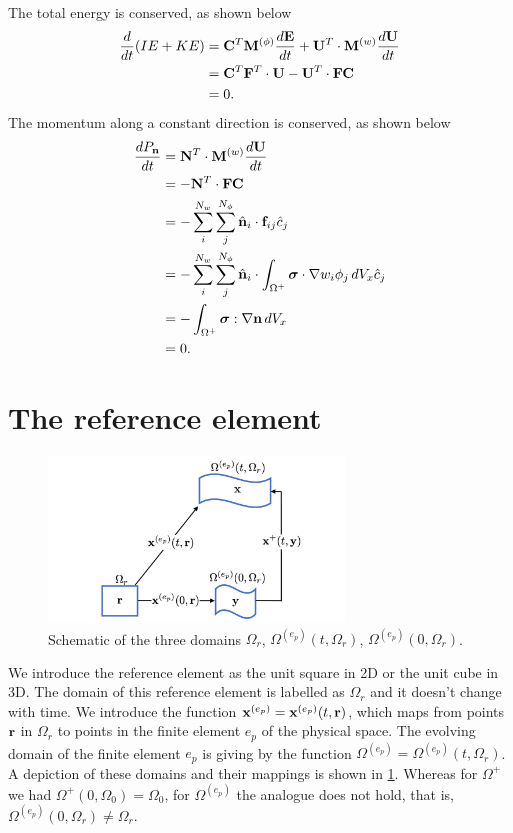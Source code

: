 \documentclass[11pt]{report}
\begin{document}
The total energy is conserved, as shown below
\begin{align}
    \frac{d}{dt} (IE + KE) &= \mathbf{C}^T \mathbf{M}^{(\phi)} \frac{d\mathbf{E}}{dt} + \mathbf{U}^T \cdot \mathbf{M}^{(w)} \frac{d\mathbf{U}}{dt} \nonumber \\
    &= \mathbf{C}^T \mathbf{F}^T \cdot \mathbf{U} - \mathbf{U}^T \cdot \mathbf{F} \mathbf{C} \nonumber \\
    &= 0.
\end{align}
The momentum along a constant direction is conserved, as shown below
\begin{align}
    \frac{d P_{\mathbf{n}}}{dt} &= \mathbf{N}^T \cdot \mathbf{M}^{(w)} \frac{d \mathbf{U}}{dt} \nonumber \\
    &= -\mathbf{N}^T \cdot \mathbf{F} \mathbf{C} \nonumber \\
    &= -\sum_i^{N_w} \sum_j^{N_\phi} \hat{\mathbf{n}}_i \cdot \mathbf{f}_{ij} \hat{c}_j \nonumber \\
    &= -\sum_i^{N_w} \sum_j^{N_\phi} \hat{\mathbf{n}}_i \cdot \int_{\Omega^+} \bm \sigma \cdot \nabla w_i \phi_j \, dV_x \hat{c}_j \nonumber \\
    &= -\int_{\Omega^+} \bm \sigma : \nabla \mathbf{n} \, dV_x \nonumber \\
    &= 0.
\end{align}

\section{The reference element}
\begin{figure}[ht]
    \centering
    \includegraphics[width=0.7\textwidth]{../../images/three_spaces.pdf}
    \caption{Schematic of the three domains $\Omega_r$, $\Omega^{(e_p)}(t,\Omega_r)$, $\Omega^{(e_p)}(0,\Omega_r)$.}
    \label{fig:three_spaces}
 \end{figure}
We introduce the reference element as the unit square in 2D or the unit cube in 3D. The domain of this reference element is labelled as $\Omega_r$ and it doesn't change with time. We introduce the function $\mathbf{x}^{(e_p)} = \mathbf{x}^{(e_p)}(t,\mathbf{r})$, which maps from points $\mathbf{r}$ in $\Omega_r$ to points in the finite element $e_p$ of the physical space. The evolving domain of the finite element $e_p$ is giving  by the function $\Omega^{(e_p)} = \Omega^{(e_p)}(t,\Omega_r)$. A depiction of these domains and their mappings is shown in \cref{fig:three_spaces}. Whereas for $\Omega^+$ we had $\Omega^+(0,\Omega_0)=\Omega_0$, for $\Omega^{(e_p)}$ the analogue does not hold, that is, $\Omega^{(e_p)}(0,\Omega_r) \ne \Omega_r$.
\end{document}
